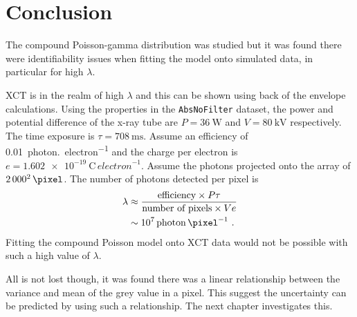 \section{Conclusion}
The compound Poisson-gamma distribution was studied but it was found there were identifiability issues when fitting the model onto simulated data, in particular for high $\lambda$.

XCT is in the realm of high $\lambda$ and this can be shown using back of the envelope calculations. Using the properties in the \texttt{AbsNoFilter} dataset, the power and potential difference of the x-ray tube are $P=\SI{36}{\watt}$ and $V=\SI{80}{\kilo\volt}$ respectively. The time exposure is $\tau=\SI{708}{\milli\second}$. Assume an efficiency of \SI{0.01}{{photon.}{electron}^{-1}} and the charge per electron is $e=\SI{1.602e-19}{\coulomb\,{electron}^{-1}}$. Assume the photons projected onto the array of $2\,000^2\,\si{\pixel}$. The number of photons detected per pixel is
\begin{align*}
\lambda &\approx \dfrac{\text{efficiency} \times P \tau}{\text{number of pixels} \times V e}
\\
&\sim 10^7\,\si{{photon}\,\pixel^{-1}}
\ .
\end{align*}
Fitting the compound Poisson model onto XCT data would not be possible with such a high value of $\lambda$.

All is not lost though, it was found there was a linear relationship between the variance and mean of the grey value in a pixel. This suggest the uncertainty can be predicted by using such a relationship. The next chapter investigates this.